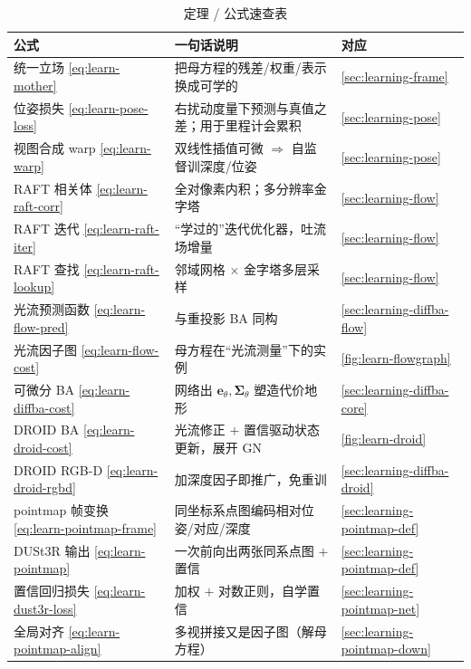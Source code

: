 \begin{table}[H]\centering\small
\caption{定理 / 公式速查表}
\begin{tabular}{lll}
\toprule
公式 & 一句话说明 & 对应 \\
\midrule
统一立场 \cref{eq:learn-mother} & 把母方程的残差/权重/表示换成可学的 & \cref{sec:learning-frame} \\
位姿损失 \cref{eq:learn-pose-loss} & 右扰动度量下预测与真值之差；用于里程计会累积 & \cref{sec:learning-pose} \\
视图合成 warp \cref{eq:learn-warp} & 双线性插值可微 $\Rightarrow$ 自监督训深度/位姿 & \cref{sec:learning-pose} \\
RAFT 相关体 \cref{eq:learn-raft-corr} & 全对像素内积；多分辨率金字塔 & \cref{sec:learning-flow} \\
RAFT 迭代 \cref{eq:learn-raft-iter} & “学过的”迭代优化器，吐流场增量 & \cref{sec:learning-flow} \\
RAFT 查找 \cref{eq:learn-raft-lookup} & 邻域网格 $\times$ 金字塔多层采样 & \cref{sec:learning-flow} \\
光流预测函数 \cref{eq:learn-flow-pred} & 与重投影 BA 同构 & \cref{sec:learning-diffba-flow} \\
光流因子图 \cref{eq:learn-flow-cost} & 母方程在“光流测量”下的实例 & \cref{fig:learn-flowgraph} \\
可微分 BA \cref{eq:learn-diffba-cost} & 网络出 $\mathbf{e}_\theta,\boldsymbol\Sigma_\theta$ 塑造代价地形 & \cref{sec:learning-diffba-core} \\
DROID BA \cref{eq:learn-droid-cost} & 光流修正 $+$ 置信驱动状态更新，展开 GN & \cref{fig:learn-droid} \\
DROID RGB-D \cref{eq:learn-droid-rgbd} & 加深度因子即推广，免重训 & \cref{sec:learning-diffba-droid} \\
pointmap 帧变换 \cref{eq:learn-pointmap-frame} & 同坐标系点图编码相对位姿/对应/深度 & \cref{sec:learning-pointmap-def} \\
DUSt3R 输出 \cref{eq:learn-pointmap} & 一次前向出两张同系点图 $+$ 置信 & \cref{sec:learning-pointmap-def} \\
置信回归损失 \cref{eq:learn-dust3r-loss} & 加权 $+$ 对数正则，自学置信 & \cref{sec:learning-pointmap-net} \\
全局对齐 \cref{eq:learn-pointmap-align} & 多视拼接又是因子图（解母方程）& \cref{sec:learning-pointmap-down} \\
\bottomrule
\end{tabular}
\end{table}

